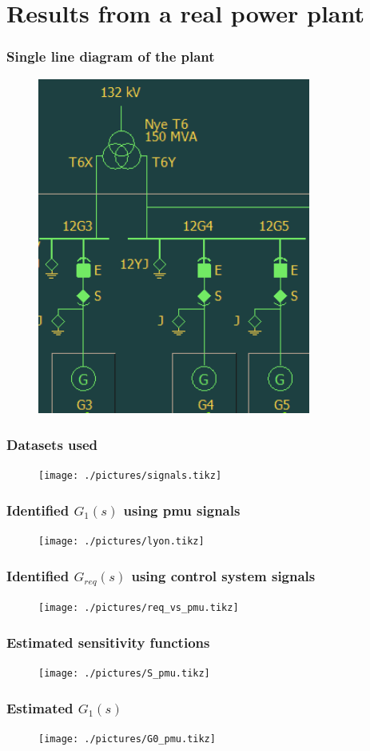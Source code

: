 \section{Results from a real power plant}
\begin{frame}
	\frametitle{Single line diagram of the plant}
	\begin{figure}
			\includegraphics[width=0.8\textwidth]{./pictures/plant.png}
	\end{figure}
\end{frame}
\begin{frame}
	\frametitle{Datasets used}
	\begin{figure}
			\texttt{[image: ./pictures/signals.tikz]}
	\end{figure}
\end{frame}
\begin{frame}
		\frametitle{Identified $G_1(s)$ using pmu signals}
	\begin{figure}
			\texttt{[image: ./pictures/lyon.tikz]}
	\end{figure}
\end{frame}
\begin{frame}
		\frametitle{Identified $G_{req}(s)$ using control system signals}
	\begin{figure}
			\texttt{[image: ./pictures/req\_vs\_pmu.tikz]}
	\end{figure}
\end{frame}
\begin{frame}
	\frametitle{Estimated sensitivity functions}
		\begin{figure}[tb]
			\texttt{[image: ./pictures/S\_pmu.tikz]}
		\end{figure}
\end{frame}
\begin{frame}
	\frametitle{Estimated $G_1(s)$}
		\begin{figure}[tb]
			\texttt{[image: ./pictures/G0\_pmu.tikz]}
		\end{figure}
\end{frame}
